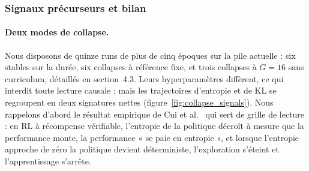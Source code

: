\documentclass[11pt,a4paper]{article}
\begin{document}
\subsubsection{Signaux précurseurs et bilan}

\paragraph{Deux modes de collapse.} Nous disposons de quinze runs de plus de cinq époques sur la pile actuelle : six stables sur la durée, six collapses à référence fixe, et trois collapses à $G=16$ sans curriculum, détaillés en section~4.3. Leurs hyperparamètres diffèrent, ce qui interdit toute lecture causale ; mais les trajectoires d'entropie et de KL se regroupent en deux signatures nettes (figure~\ref{fig:collapse_signals}). Nous rappelons d'abord le résultat empirique de Cui et al.~\cite{cui2025entropy} qui sert de grille de lecture : en RL à récompense vérifiable, l'entropie de la politique décroît à mesure que la performance monte, la performance « se paie en entropie », et lorsque l'entropie approche de zéro la politique devient déterministe, l'exploration s'éteint et l'apprentissage s'arrête.
\end{document}
